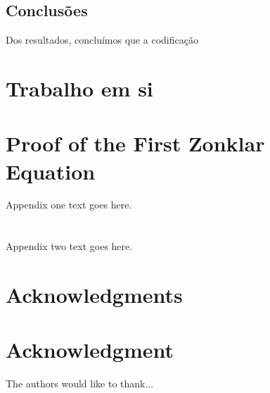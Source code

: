 \documentclass[12pt,journal,compsoc]{IEEEtran}
\begin{document}
\subsection{Conclusões}
Dos resultados, concluímos que a codificação




\section{Trabalho em si}\label{sec:.....} %

\appendices
\section{Proof of the First Zonklar Equation}
Appendix one text goes here.

\section{}
Appendix two text goes here.


\ifCLASSOPTIONcompsoc
  \section*{Acknowledgments}
\else
  \section*{Acknowledgment}
\fi

The authors would like to thank...

\ifCLASSOPTIONcaptionsoff
  \newpage
\fi


\footnotemark 


\end{document}
